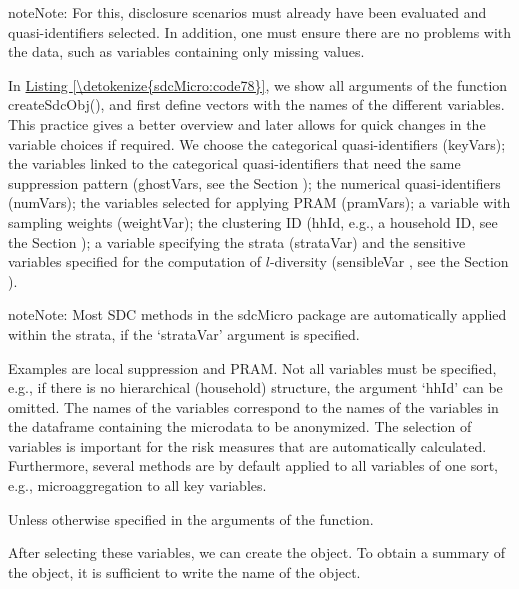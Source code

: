 \documentclass[letterpaper,10pt,english]{sphinxmanual}
\begin{document}
\begin{sphinxadmonition}{note}{Note:}
For this, disclosure scenarios must already have been evaluated and quasi-identifiers
selected. In addition, one must ensure there are no problems with the
data, such as variables containing only missing values.
\end{sphinxadmonition}

In \hyperref[\detokenize{sdcMicro:code78}]{Listing \ref{\detokenize{sdcMicro:code78}}}, we show all arguments of the function createSdcObj(),
and first define vectors with the names of the different variables. This
practice gives a better overview and later allows for quick changes in
the variable choices if required. We choose the categorical
quasi-identifiers (keyVars); the variables linked to the categorical
quasi-identifiers that need the same suppression pattern (ghostVars, see the
Section );
the numerical quasi-identifiers (numVars); the variables
selected for applying PRAM (pramVars); a variable with sampling weights
(weightVar); the clustering ID (hhId, e.g., a household ID, see the Section
);
a variable specifying the strata (strataVar) and the sensitive
variables specified for the computation of \(l\)-diversity
(sensibleVar , see the Section
).

\begin{sphinxadmonition}{note}{Note:}
Most SDC methods in the
sdcMicro package are automatically applied within the strata, if the
‘strataVar’ argument is specified.
\end{sphinxadmonition}

Examples are local suppression and
PRAM. Not all variables must be specified, e.g., if there is no
hierarchical (household) structure, the argument ‘hhId’ can be omitted.
The names of the variables correspond to the names of the variables in
the dataframe containing the microdata to be anonymized. The selection
of variables is important for the risk measures that are automatically
calculated. Furthermore, several methods are by default applied to all
variables of one sort, e.g., microaggregation to all key
variables. %
\begin{footnote}[6]\sphinxAtStartFootnote
Unless otherwise specified in the arguments of the function.
%
\end{footnote} After selecting these variables, we can
create the  object. To obtain a summary of the object, it is
sufficient to write the name of the object.
\end{document}
